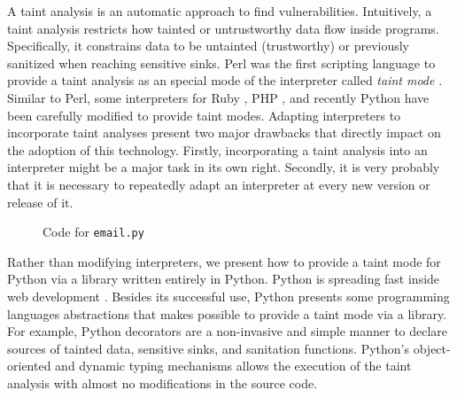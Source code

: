 \documentclass[oribibl]{llncs}
\begin{document}
A taint analysis is an automatic approach to find vulnerabilities.
Intuitively, a taint analysis restricts how tainted or untrustworthy 
data flow inside programs. Specifically, it constrains data 
to be untainted (trustworthy) 
or previously sanitized when 
reaching sensitive sinks. 
Perl was the first scripting 
language to provide a taint analysis 
as an special mode of the  
interpreter called \emph{taint mode} \cite{BekmanCholet2003}. 
Similar to Perl, some interpreters for 
 Ruby \cite{thomas2004prub}, PHP \cite{Nguyen05}, and 
recently Python \cite{KozlovPetukhov07} have been 
carefully modified to provide taint modes.
Adapting interpreters to incorporate taint analyses 
present two major drawbacks that directly 
impact on the adoption of this technology. 
Firstly, incorporating a taint analysis into an interpreter 
might be a major task in its own right. Secondly, it is 
very probably that it is necessary to repeatedly adapt an  
interpreter at every new version or release of it.


\begin{wrapfigure}{r}{6.5cm}
\vspace{-25pt}
{\small{

\caption{\label{fig:example}Code for \texttt{email.py}}
}}
\vspace{-15pt}
\end{wrapfigure}
Rather than modifying interpreters, we present how to provide
a taint mode for Python via a library written entirely in Python. 
Python is spreading fast inside
web development \cite{WikiPython}. 
Besides its successful use, Python presents 
some programming languages abstractions that makes possible 
to provide a taint mode via a library. For example, 
Python decorators \cite{Lutz:1999:LP} are a non-invasive and simple 
manner to declare sources of tainted data, sensitive sinks, and 
sanitation functions. Python's 
object-oriented and dynamic typing mechanisms allows the 
execution of the taint analysis with almost no modifications in the
source code. 
\end{document}

